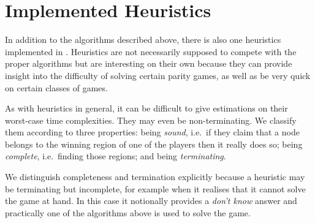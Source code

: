 \section{Implemented Heuristics}

In addition to the algorithms described above, there is also one heuristics implemented in \pgsolver.
Heuristics are not necessarily supposed to compete with the proper algorithms but are interesting on
their own because they can provide insight into the difficulty of solving certain parity games, as well
as be very quick on certain classes of games.

As with heuristics in general, it can be difficult to give estimations on their worst-case time
complexities. They may even be non-terminating. We classify them according to three properties: being
\emph{sound}, i.e.\ if they claim that a node belongs to the winning region of one of the players then
it really does so; being \emph{complete}, i.e.\ finding those regions; and being \emph{terminating}.

We distinguish completeness and termination explicitly because a heuristic may be terminating but incomplete,
for example when it realises that it cannot solve the game at hand. In this case it notionally provides
a \emph{don't know} answer and practically one of the algorithms above is used to solve the game.



